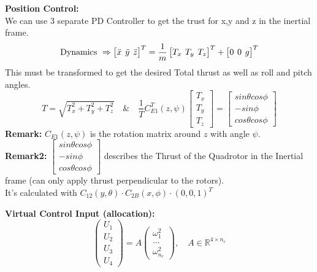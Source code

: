 \documentclass[fontsize=6pt,DIV=calc,a4paper,ngerman]{scrartcl}
\begin{document}
\begin{multicols*}{4}
	\smallskip
	\textbf{Position Control:}\\
	We can use 3 separate PD Controller to get the trust for x,y and z in the inertial frame.
	$$\text{Dynamics } \Rightarrow \setlength\arraycolsep{2pt}\begin{bmatrix}\ddot{x} &\ddot{y}&\ddot{z} \end{bmatrix}^T = \frac{1}{m}\begin{bmatrix}T_x&T_y&T_z \end{bmatrix}^T + \begin{bmatrix}0 &0 &g \end{bmatrix}^T$$
	This must be transformed to get the desired Total thrust as well as roll and pitch angles.
	$$T = \sqrt{T_x^2+T_y^2+T_z^2} \quad \& \quad \frac{1}{T} C_{E1}^T(z,\psi)
		\begin{bmatrix}
			T_x \\ T_y \\ T_z
		\end{bmatrix}
		=
		\begin{bmatrix}
			sin\theta cos\phi \\ -sin\phi \\ cos\theta cos\phi
		\end{bmatrix}$$
	\textbf{Remark:} $C_{E1}(z,\psi)$ is the rotation matrix around $z$ with angle $\psi$.\\
	\textbf{Remark2:} $\left[\begin{smallmatrix} sin\theta cos\phi  \\ -sin\phi \\ cos\theta cos\phi \end{smallmatrix}\right]$ describes the Thrust of the Quadrotor in the Inertial frame (can only apply thrust perpendicular to the rotors). \\
	It's calculated with $C_{12}(y,\theta)\cdot C_{2B}(x,\phi)\cdot (0,0,1)^T$
	
	\textbf{Virtual Control Input (allocation):}\\
	$$\left(\begin{smallmatrix}
				U_1 \\U_2\\U_3\\U_4
			\end{smallmatrix}\right) = A \begin{pmatrix}
			\omega^2_1 \\ ...\\\omega^2_{n_r}
		\end{pmatrix} , \quad A\in \mathbb{R}^{4\times n_r}$$
	

\end{multicols*}
\end{document}
